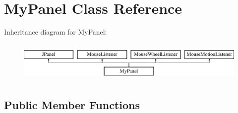 \hypertarget{class_my_panel}{}\section{My\+Panel Class Reference}
\label{class_my_panel}
Inheritance diagram for My\+Panel\+:\begin{figure}[H]
\begin{center}
\leavevmode
\includegraphics[height=1.985816cm]{class_my_panel}
\end{center}
\end{figure}
\subsection*{Public Member Functions}
